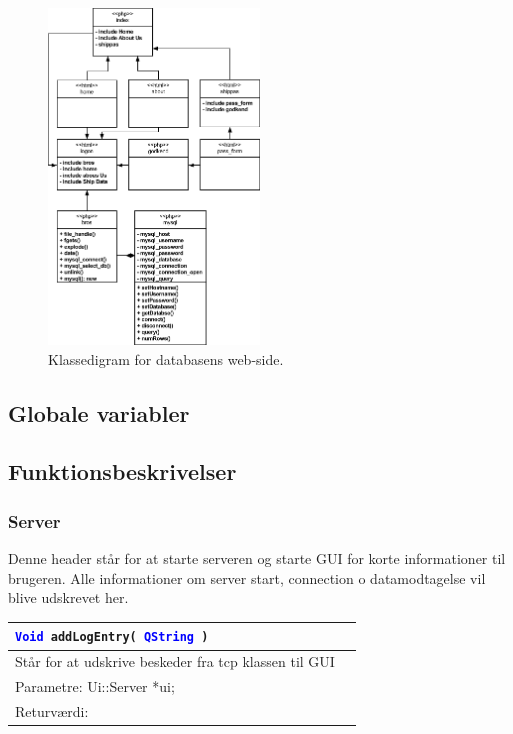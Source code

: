 \begin{figure}[H]
	\centering
	\includegraphics[width=0.5\textwidth]{billeder/web_klasse}
	\caption{Klassedigram for databasens web-side.}
	\label{fig:serverKlassediagram}
\end{figure}


\subsection{Globale variabler}


\subsection{Funktionsbeskrivelser}
\subsubsection{Server}
Denne header står for at starte serveren og starte GUI for korte informationer til brugeren. Alle informationer om server start, connection o datamodtagelse vil blive udskrevet her. 

\begin{table}[H]
\begin{tabular}{l p{12.5cm}}
\multicolumn{2}{l}{\texttt{\textcolor{blue}{Void} addLogEntry( \textcolor{blue}{QString} )}} \\
\hline
Står for at udskrive beskeder fra tcp klassen til GUI \\
Parametre: Ui::Server *ui;\\
Returværdi:&\\
\end{tabular}
\end{table}

